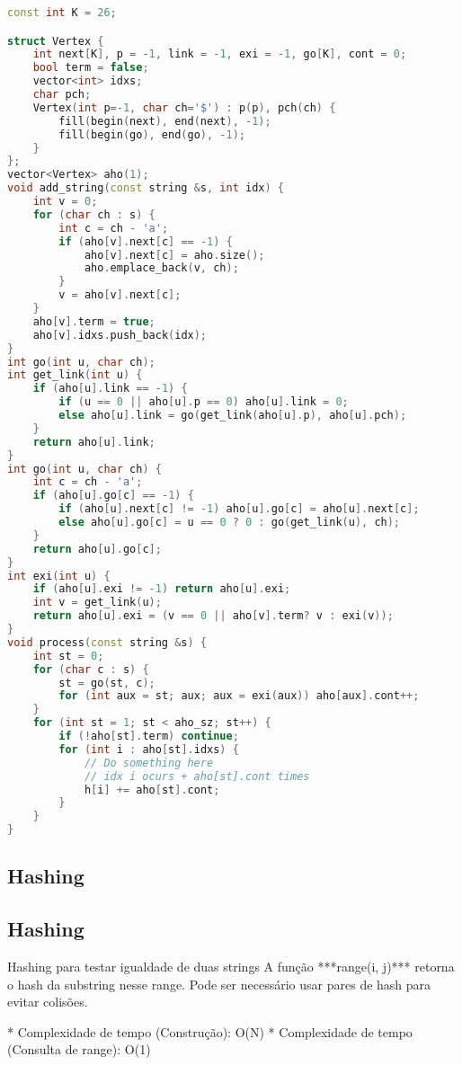 \documentclass[11pt, a4paper, twoside]{article}
\begin{document}
\begin{lstlisting}[language=C++]
const int K = 26;

struct Vertex {
    int next[K], p = -1, link = -1, exi = -1, go[K], cont = 0;
    bool term = false;
    vector<int> idxs;
    char pch;
    Vertex(int p=-1, char ch='$') : p(p), pch(ch) {
        fill(begin(next), end(next), -1);
        fill(begin(go), end(go), -1);
    }
};
vector<Vertex> aho(1);
void add_string(const string &s, int idx) {
    int v = 0;
    for (char ch : s) {
        int c = ch - 'a';
        if (aho[v].next[c] == -1) {
            aho[v].next[c] = aho.size();
            aho.emplace_back(v, ch);
        }
        v = aho[v].next[c];
    }
    aho[v].term = true;
    aho[v].idxs.push_back(idx);
}
int go(int u, char ch);
int get_link(int u) {
    if (aho[u].link == -1) {
        if (u == 0 || aho[u].p == 0) aho[u].link = 0;
        else aho[u].link = go(get_link(aho[u].p), aho[u].pch);
    }
    return aho[u].link;
}
int go(int u, char ch) {
    int c = ch - 'a';
    if (aho[u].go[c] == -1) {
        if (aho[u].next[c] != -1) aho[u].go[c] = aho[u].next[c];
        else aho[u].go[c] = u == 0 ? 0 : go(get_link(u), ch);
    }
    return aho[u].go[c];
}
int exi(int u) {
    if (aho[u].exi != -1) return aho[u].exi;
    int v = get_link(u);
    return aho[u].exi = (v == 0 || aho[v].term? v : exi(v));
}
void process(const string &s) {
    int st = 0;
    for (char c : s) {
        st = go(st, c);
        for (int aux = st; aux; aux = exi(aux)) aho[aux].cont++;
    }
    for (int st = 1; st < aho_sz; st++) {
        if (!aho[st].term) continue;
        for (int i : aho[st].idxs) {
            // Do something here
            // idx i ocurs + aho[st].cont times
            h[i] += aho[st].cont;
        }
    }
}
\end{lstlisting}

\subsection{Hashing}

\subsection{Hashing}



Hashing para testar igualdade de duas strings   
A função ***range(i, j)*** retorna o hash da substring nesse range.   
Pode ser necessário usar pares de hash para evitar colisões.

* Complexidade de tempo (Construção): O(N)
* Complexidade de tempo (Consulta de range): O(1)
\end{document}
